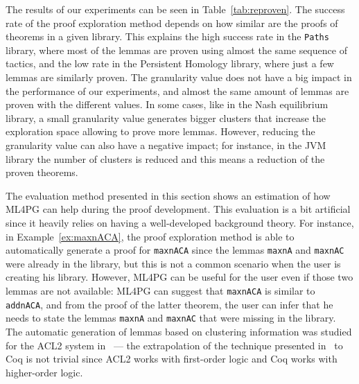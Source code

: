 The results of our experiments can be seen in Table~\ref{tab:reproven}. The success rate of the proof exploration method
depends on how similar are the proofs of theorems in a given library. This explains the high success rate in the \lstinline?Paths?
library, where most of the lemmas are proven using almost the same sequence of tactics, and the low rate in the Persistent Homology
library, where just a few lemmas are similarly proven. The granularity value does not have a big impact in the performance of
our experiments, and almost the same amount of lemmas are proven with the different values. In some cases, like in the Nash equilibrium
library, a small granularity value generates bigger clusters that increase the exploration space allowing to prove more lemmas.
However, reducing the granularity value can also have a negative impact; for instance, in the JVM library the number of clusters
is reduced and this means a reduction of the proven theorems.

The evaluation method presented in this section shows an estimation of how ML4PG can help during the proof development.
This evaluation is a bit artificial since it heavily relies on having a well-developed background theory. For instance,
in Example~\ref{ex:maxnACA}, the proof exploration method is able to automatically generate a proof for \lstinline?maxnACA? since
the lemmas \lstinline?maxnA? and \lstinline?maxnAC? were already in the library, but this is not a common scenario when the user
is creating his library. However, ML4PG can be useful for the user even if those two lemmas are not available: ML4PG can suggest
that \lstinline?maxnACA? is similar to  \lstinline?addnACA?, and from the proof of the latter theorem, the user can infer that he needs
to state the lemmas \lstinline?maxnA? and \lstinline?maxnAC? that were missing in the library. The automatic generation of lemmas based
on clustering information was studied for the ACL2 system in~\cite{lpar13} --- the extrapolation of the technique presented in~\cite{lpar13} to Coq is not trivial since ACL2 works with first-order logic and Coq works with higher-order logic.

